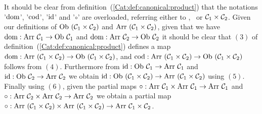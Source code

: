 It should be clear from definition~(\ref{Cat:def:canonical:product}) that
the notations '$\mbox{\rm dom}$', '$\mbox{\rm cod}$', '$\mbox{\rm id}$' and '$\circ$' are overloaded, 
referring either to \Cone, \Ctwo\ or $\mbox{${\cal C}_{1}$}\times\mbox{${\cal C}_{2}$}$. Given our definitions 
of $\mbox{\rm Ob}\ (\mbox{${\cal C}_{1}$}\times\mbox{${\cal C}_{2}$})$ and $\mbox{\rm Arr}\ (\mbox{${\cal C}_{1}$}\times\mbox{${\cal C}_{2}$})$, given that we 
have $\mbox{\rm dom}:\mbox{\rm Arr}\ \mbox{${\cal C}_{1}$}\to\mbox{\rm Ob}\ \mbox{${\cal C}_{1}$}$ and $\mbox{\rm dom}:\mbox{\rm Arr}\ \mbox{${\cal C}_{2}$}\to\mbox{\rm Ob}\ \mbox{${\cal C}_{2}$}$ it 
should be clear that $(3)$ of definition~(\ref{Cat:def:canonical:product})
defines a map $\dom:\arr\ (\Cone\times\Ctwo)\to\ob\ (\Cone\times\Ctwo)$,
and $\cod:\arr\ (\Cone\times\Ctwo)\to\ob\ (\Cone\times\Ctwo)$
follows from $(4)$. Furthermore from $\id:\ob\ \Cone\to\arr\ \Cone$
and $\id:\ob\ \Ctwo\to\arr\ \Ctwo$ we obtain $\id:\ob\ (\Cone\times\Ctwo)
\to\arr\ (\Cone\times\Ctwo)$ using $(5)$. Finally using $(6)$, given 
the partial maps $\circ:\arr\ \Cone\times\arr\ \Cone\to\arr\ \Cone$
and $\circ:\arr\ \Ctwo\times\arr\ \Ctwo\to\arr\ \Ctwo$ we obtain
a partial map $\circ:\mbox{\rm Arr}\ (\mbox{${\cal C}_{1}$}\times\mbox{${\cal C}_{2}$})\times\mbox{\rm Arr}
\ (\mbox{${\cal C}_{1}$}\times\mbox{${\cal C}_{2}$})\to\mbox{\rm Arr}\ \mbox{${\cal C}_{1}$}\times\mbox{${\cal C}_{2}$}$.

